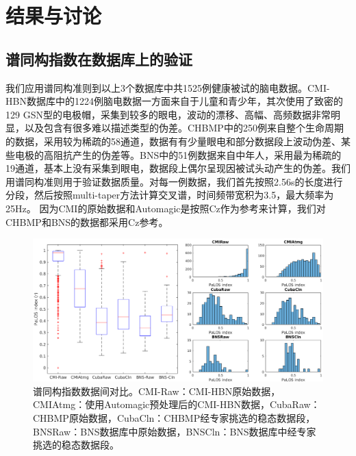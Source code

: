 \section{结果与讨论}
\subsection{谱同构指数在数据库上的验证}
我们应用谱同构准则到以上3个数据库中共1525例健康被试的脑电数据。CMI-HBN数据库中的1224例脑电数据一方面来自于儿童和青少年，其次使用了致密的129 GSN型的电极帽，采集到较多的眼电，波动的漂移、高幅、高频数据非常明显，以及包含有很多难以描述类型的伪差。CHBMP中的250例来自整个生命周期的数据，采用较为稀疏的58通道，数据有有少量眼电和部分数据段上波动伪差、某些电极的高阻抗产生的伪差等。BNS中的51例数据来自中年人，采用最为稀疏的19通道，基本上没有采集到眼电，数据段上偶尔呈现因被试头动产生的伪差。我们用谱同构准则用于验证数据质量。对每一例数据，我们首先按照2.56s的长度进行分段，然后按照multi-taper方法计算交叉谱，时间频带宽积为3.5，最大频率为25Hz。 因为CMI的原始数据和Automagic是按照Cz作为参考来计算，我们对CHBMP和BNS的数据都采用Cz参考。
\begin{figure}[!ht]
	\includegraphics[width=15cm]{pic/palos/comparison.png}
	\caption{谱同构指数数据间对比。CMI-Raw：CMI-HBN原始数据，CMIAtmg：使用Automagic预处理后的CMI-HBN数据，CubaRaw：CHBMP原始数据，CubaCln：CHBMP经专家挑选的稳态数据段，BNSRaw：BNS数据库中原始数据，BNSCln：BNS数据库中经专家挑选的稳态数据段。}
	\label{fig4}
\end{figure}
